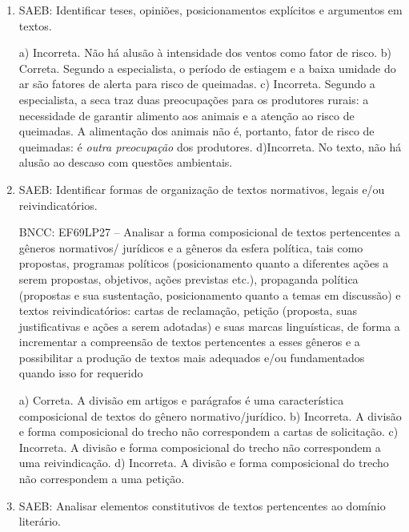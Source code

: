 \begin{enumerate}
	
	\item
SAEB: Identificar teses, opiniões, posicionamentos explícitos e
argumentos em textos.  

a) Incorreta. Não há alusão à intensidade dos ventos como fator de risco.
b) Correta. Segundo a especialista, o período de estiagem e a baixa
umidade do ar são fatores de alerta para risco de queimadas.
c) Incorreta. Segundo a especialista, a seca traz duas preocupações para 
os produtores rurais: a necessidade de garantir alimento aos animais e a 
atenção ao risco de queimadas. A alimentação dos animais não é, portanto,
fator de risco de queimadas: é \textit{outra preocupação} dos produtores. 
d)Incorreta. No texto, não há alusão ao descaso com questões ambientais.

	\item
SAEB: Identificar formas de organização de textos normativos, legais e/ou reivindicatórios.

BNCC: EF69LP27 -- Analisar a forma composicional de textos pertencentes a
gêneros normativos/ jurídicos e a gêneros da esfera política, tais como
propostas, programas políticos (posicionamento quanto a diferentes ações
a serem propostas, objetivos, ações previstas etc.), propaganda política
(propostas e sua sustentação, posicionamento quanto a temas em
discussão) e textos reivindicatórios: cartas de reclamação, petição
(proposta, suas justificativas e ações a serem adotadas) e suas marcas
linguísticas, de forma a incrementar a compreensão de textos
pertencentes a esses gêneros e a possibilitar a produção de textos mais
adequados e/ou fundamentados quando isso for requerido

a) Correta. A divisão em artigos e parágrafos é uma característica
composicional de textos do gênero normativo/jurídico.
b) Incorreta. A divisão e forma composicional do trecho não correspondem
a cartas de solicitação.
c) Incorreta. A divisão e forma composicional do trecho não correspondem
a uma reivindicação.
d) Incorreta. A divisão e forma composicional do trecho não correspondem
a uma petição.	

	\item
SAEB: Analisar elementos constitutivos de textos pertencentes ao domínio
literário.


\end{enumerate}
